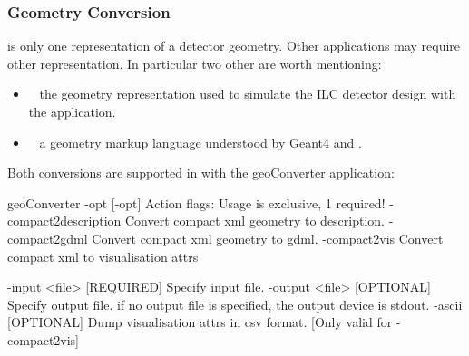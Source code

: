 \documentclass[10pt,a4paper]{article}
\begin{document}
\subsubsection{Geometry Conversion}
\label{sec:dd4hep-manual-geometry-conversion}
\noindent
{}  is only one representation of a detector geometry.
Other applications may require other representation. In particular two other
are worth mentioning:
\begin{itemize}\itemcompact
\item {}~\cite{bib:Detector} the geometry representation used to 
    simulate the ILC detector design with the  application.
\item {}~\cite{bib:GDML} a geometry markup language understood
    by Geant4 and .
\end{itemize}
Both conversions are supported in \DDhep with the geoConverter application:
\begin{code}
  geoConverter -opt [-opt]                                                
        Action flags:               Usage is exclusive, 1 required!           
        -compact2description               Convert compact xml geometry to description.     
        -compact2gdml               Convert compact xml geometry to gdml.     
        -compact2vis                Convert compact xml to visualisation attrs

        -input  <file>  [REQUIRED]  Specify input file.                       
        -output <file>  [OPTIONAL]  Specify output file.                      
                                    if no output file is specified, the output
                                    device is stdout.                         
        -ascii          [OPTIONAL]  Dump visualisation attrs in csv format.   
                                    [Only valid for -compact2vis]             
\end{code}

\end{document}
